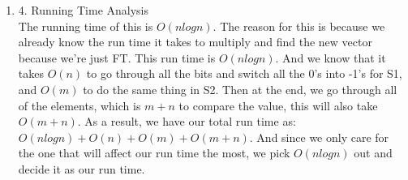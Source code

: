 \documentclass[11pt]{article}
\newenvironment{qparts}{\begin{enumerate}[{(}a{)}]}{\end{enumerate}}
\begin{document}
\begin{qparts}
\begin{qparts}
\item[4.] Running Time Analysis \\
The running time of this is $O(nlogn)$. The reason for this is because we already know the run time it takes to multiply and find the new vector because we're just FT. This run time is $O(nlogn)$. And we know that it takes $O(n)$ to go through all the bits and switch all the 0's into -1's for S1, and $O(m)$ to do the same thing in S2. Then at the end, we go through all of the elements, which is $m+n$ to compare the value, this will also take $O(m+n)$. As a result, we have our total run time as: $O(nlogn) + O(n) + O(m) + O(m+n)$. And since we only care for the one that will affect our run time the most, we pick $O(nlogn)$ out and decide it as our run time. 
\end{qparts}
\end{qparts}
\end{document}
